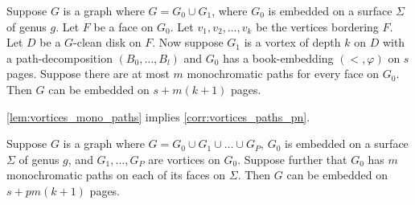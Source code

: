 \begin{lemma}\label{lem:vortices_mono_paths}
	Suppose \(G\) is a graph where $G = G_0 \cup G_1$, where \(G_0\) is embedded on a surface \(\Sigma \) of genus \(g\). Let \(F\) be a face on \(G_0\). Let \(v_1, v_2, \ldots, v_k\) be the vertices bordering \(F\). Let \(D\) be a \(G\)-clean disk on \(F\). Now suppose \(G_1\) is a vortex of depth $k$ on \(D\) with a path-decomposition \((B_0, \ldots, B_l)\) and \(G_0\) has a book-embedding \((<, \varphi)\) on $s$ pages. Suppose there are at most \(m\) monochromatic paths for every face on $G_0$. Then \(G\) can be embedded on \(s + m(k+1)\) pages.
\end{lemma}

\cref{lem:vortices_mono_paths} implies \cref{corr:vortices_paths_pn}.

\begin{corollary}\label{corr:vortices_paths_pn}
	Suppose $G$ is a graph where $G = G_0 \cup G_1 \cup \ldots \cup G_P$, $G_0$ is embedded on a surface $\Sigma$ of genus $g$, and $G_1, \ldots ,G_P$ are vortices on $G_0$. Suppose further that $G_0$ has $m$ monochromatic paths on each of its faces on $\Sigma$. Then $G$ can be embedded on $s + pm(k+1)$ pages.
\end{corollary}

